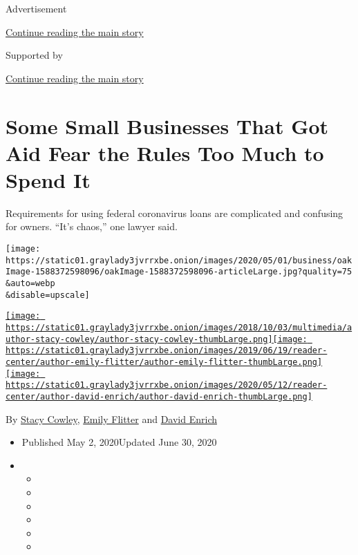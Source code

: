 Advertisement

\protect\hyperlink{after-top}{Continue reading the main story}

Supported by

\protect\hyperlink{after-sponsor}{Continue reading the main story}

\hypertarget{some-small-businesses-that-got-aid-fear-the-rules-too-much-to-spend-it}{%
\section{Some Small Businesses That Got Aid Fear the Rules Too Much to
Spend
It}\label{some-small-businesses-that-got-aid-fear-the-rules-too-much-to-spend-it}}

Requirements for using federal coronavirus loans are complicated and
confusing for owners. ``It's chaos,'' one lawyer said.

\texttt{[image: https://static01.graylady3jvrrxbe.onion/images/2020/05/01/business/oakImage-1588372598096/oakImage-1588372598096-articleLarge.jpg?quality=75\\\&auto=webp\\\&disable=upscale]}

\href{https://www.nytimes3xbfgragh.onion/by/stacy-cowley}{\texttt{[image: https://static01.graylady3jvrrxbe.onion/images/2018/10/03/multimedia/author-stacy-cowley/author-stacy-cowley-thumbLarge.png]}}\href{https://www.nytimes3xbfgragh.onion/by/emily-flitter}{\texttt{[image: https://static01.graylady3jvrrxbe.onion/images/2019/06/19/reader-center/author-emily-flitter/author-emily-flitter-thumbLarge.png]}}\href{https://www.nytimes3xbfgragh.onion/by/david-enrich}{\texttt{[image: https://static01.graylady3jvrrxbe.onion/images/2020/05/12/reader-center/author-david-enrich/author-david-enrich-thumbLarge.png]}}

By \href{https://www.nytimes3xbfgragh.onion/by/stacy-cowley}{Stacy
Cowley},
\href{https://www.nytimes3xbfgragh.onion/by/emily-flitter}{Emily
Flitter} and
\href{https://www.nytimes3xbfgragh.onion/by/david-enrich}{David Enrich}

\begin{itemize}
\item
  Published May 2, 2020Updated June 30, 2020
\item
  \begin{itemize}
  \item
  \item
  \item
  \item
  \item
  \item
  \end{itemize}
\end{itemize}

